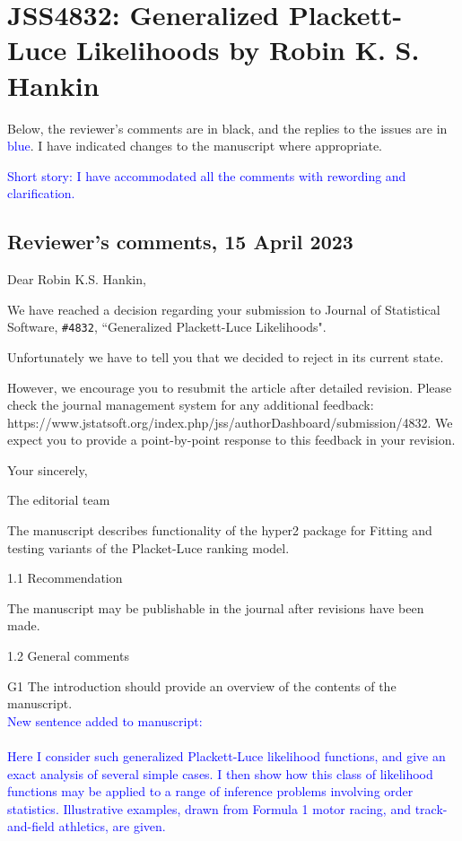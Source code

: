 \documentclass[12pt]{article}
\begin{document}
\section*{JSS4832: Generalized Plackett-Luce Likelihoods by Robin
K. S. Hankin}


Below, the reviewer's comments are in black, and the replies to the
issues are in \textcolor{blue}{blue}.  I have indicated changes to
the manuscript where appropriate.

\textcolor{blue}{Short story: I have accommodated all the comments with
rewording and clarification.}

\subsection*{Reviewer's comments, 15 April 2023}


Dear Robin K.S. Hankin,

We have reached a decision regarding your submission to Journal of
Statistical Software, \verb+#4832+, ``Generalized Plackett-Luce
Likelihoods".

Unfortunately we have to tell you that we decided to reject in its current state.

However, we encourage you to resubmit the article after detailed
revision. Please check the journal management system for any
additional feedback:
https://www.jstatsoft.org/index.php/jss/authorDashboard/submission/4832. We
expect you to provide a point-by-point response to this feedback in
your revision.

Your sincerely,

The editorial team

The manuscript describes functionality of the hyper2 package for
Fitting and testing variants of the Placket-Luce ranking model.

1.1 Recommendation

The manuscript may be publishable in the journal after revisions have been
made.

1.2 General comments

G1 The introduction should provide an overview of the contents of the
manuscript. \\  \textcolor{blue}{New sentence added to manuscript:\\ \\
Here I consider such generalized Plackett-Luce likelihood functions,
and give an exact analysis of several simple cases.  I then show how
this class of likelihood functions may be applied to a range of
inference problems involving order statistics.  Illustrative examples,
drawn from Formula 1 motor racing, and track-and-field athletics, are
given.}\\ \\
\end{document}
